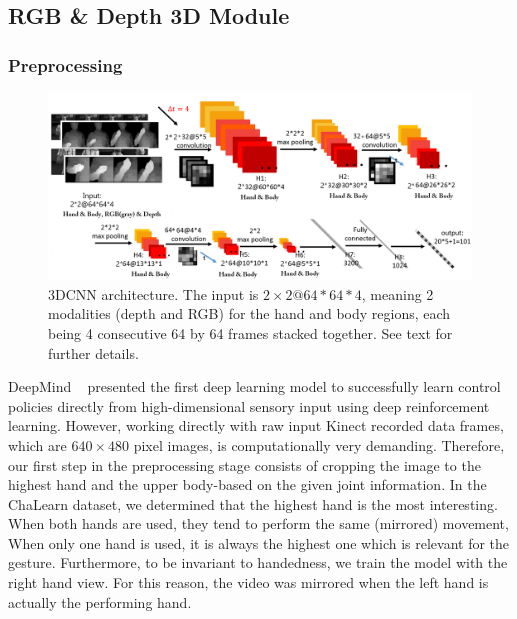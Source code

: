 \subsection{RGB \& Depth 3D Module} \label{sec:rgbd_modules}
\subsubsection{Preprocessing}\label{3d_preproc}
\begin{figure}[t]
  \centering
  \includegraphics[width=.9\textwidth]{images/3DCNN_new}
\vspace*{-2mm}
  \caption{3DCNN architecture. The input is $2\times2@64\ast64\ast4$, meaning 2 modalities (depth and RGB)  for the hand and body regions,
each  being 4  consecutive 64 by 64 frames stacked together. See text for further details.
%
}
\label{3dcnn_architecture}
\end{figure}
DeepMind ~\cite{mnih2013playing} presented the first deep learning model to successfully learn control policies directly from high-dimensional sensory input using deep reinforcement learning. However,  working directly with raw input Kinect recorded data frames, which are $640 \times 480$ pixel images, is computationally very demanding.
Therefore, our first step in the preprocessing stage consists of cropping the image to the highest hand and the upper body-based on the given joint information. In the ChaLearn dataset, we determined that the highest hand is the most interesting. When both hands are used, they tend to perform the same (mirrored) movement, When only one hand is used, it is always the highest one which is relevant for the gesture.
Furthermore, to be invariant to handedness, we train the model with the right hand view.
For this reason,  the video was mirrored when the left hand is actually the performing hand.


